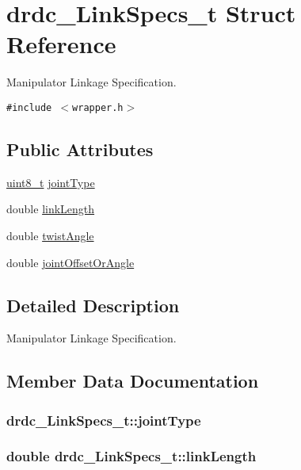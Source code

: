 \hypertarget{structdrdc__LinkSpecs__t}{
\section{drdc\_\-LinkSpecs\_\-t Struct Reference}
\label{structdrdc__LinkSpecs__t}
}
Manipulator Linkage Specification.  


{\tt \#include $<$wrapper.h$>$}

\subsection*{Public Attributes}
\begin{CompactItemize}
\item 
\hyperlink{libdrdc_8h_ba7bc1797add20fe3efdf37ced1182c5}{uint8\_\-t} \hyperlink{structdrdc__LinkSpecs__t_e8e218455dc04d9fccd0954ba446af62}{jointType}
\item 
double \hyperlink{structdrdc__LinkSpecs__t_c7e77f3a591f115aa8e9c3b582a54848}{linkLength}
\item 
double \hyperlink{structdrdc__LinkSpecs__t_5222246e9e9d580348061c81b6fc9c54}{twistAngle}
\item 
double \hyperlink{structdrdc__LinkSpecs__t_084534cd7b324bbb2eb8575e163f58d9}{jointOffsetOrAngle}
\end{CompactItemize}


\subsection{Detailed Description}
Manipulator Linkage Specification. 



\subsection{Member Data Documentation}
\hypertarget{structdrdc__LinkSpecs__t_e8e218455dc04d9fccd0954ba446af62}{
\subsubsection[jointType]{ {\bf drdc\_\-LinkSpecs\_\-t::jointType}}}
\label{structdrdc__LinkSpecs__t_e8e218455dc04d9fccd0954ba446af62}


\hypertarget{structdrdc__LinkSpecs__t_c7e77f3a591f115aa8e9c3b582a54848}{
\subsubsection[linkLength]{\setlength{\rightskip}{0pt plus 5cm}double {\bf drdc\_\-LinkSpecs\_\-t::linkLength}}}
\label{structdrdc__LinkSpecs__t_c7e77f3a591f115aa8e9c3b582a54848}


